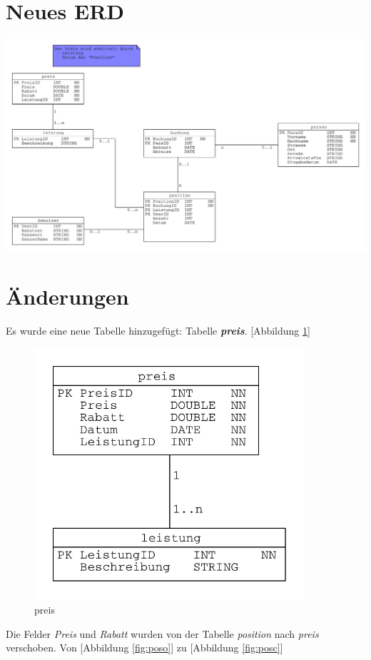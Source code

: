 \documentclass[11pt,twoside,a4paper]{article}
\title{\titleText}
\author{\authorText}
\date{\dateText}
\begin{document}
	\maketitle
	\tableofcontents
	\section{Neues ERD}
	\includegraphics[width=14cm]{erd}
	\section{Änderungen}
	Es wurde eine neue Tabelle hinzugefügt: Tabelle \textit{\textbf{preis}}. [Abbildung \ref{fig:preis}]
	
	\begin{figure}
		\includegraphics[width=10cm]{erd_change}
		\caption{preis \label{fig:preis}}
	\end{figure}
	
	
	Die Felder \textit{Preis} und \textit{Rabatt} wurden von der Tabelle \textit{position} nach \textit{preis} verschoben. Von [Abbildung \ref{fig:poso}] zu [Abbildung \ref{fig:posc}]
	
\end{document}
